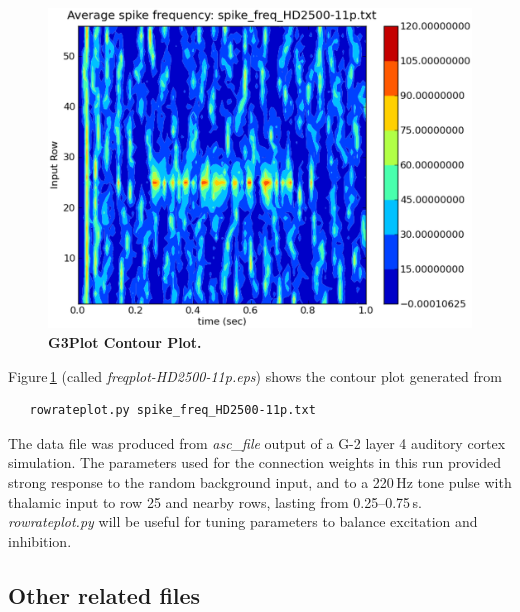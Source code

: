 \documentclass[12pt]{article}
\begin{document}
\begin{itemize}
\begin{figure}[h]
  \centering
   \includegraphics[scale=0.5]{figures/freqplot-HD2500-11p.eps}
\caption{\bf G3Plot Contour Plot.}
  \label{fig:g3p-3}
\end{figure}

Figure\,\ref{fig:g3p-3} (called {\it freqplot-HD2500-11p.eps}) shows the contour plot generated from
\begin{verbatim}
   rowrateplot.py spike_freq_HD2500-11p.txt
\end{verbatim}

The data file was produced from {\it asc\_file} output of a G-2 layer 4
auditory cortex simulation.  The parameters used for the connection weights
in this run provided strong response to the random background input, and to
a 220\,Hz tone pulse with thalamic input to row 25 and nearby rows, lasting
from 0.25--0.75\,s.  {\it rowrateplot.py} will be useful for tuning
parameters to balance excitation and inhibition.

\end{itemize}

\subsection*{Other related files}
\end{document}
